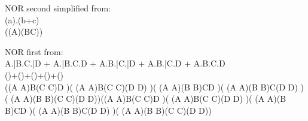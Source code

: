 NOR
 second simplified from: $$$$(a).(b+c)$$
$$$$
$$$$
$$((A)\downarrow (B\downarrow C))$$$$


NOR
 first from: $$$$A.\bar B.C.\bar D + A.\bar B.C.D + A.B.\bar C.\bar D + A.B.\bar C.D + A.B.C.D$$
$$()+()+()+()+()$$
$$$$
$$((A \downarrow  A)\downarrow B\downarrow (C \downarrow  C)\downarrow D )\downarrow ( (A \downarrow  A)\downarrow B\downarrow (C \downarrow  C)\downarrow (D \downarrow  D) )\downarrow ( (A \downarrow  A)\downarrow (B \downarrow  B)\downarrow C\downarrow D )\downarrow ( (A \downarrow  A)\downarrow (B \downarrow  B)\downarrow C\downarrow (D \downarrow  D) )\downarrow ( (A \downarrow  A)\downarrow (B \downarrow  B)\downarrow (C \downarrow  C)\downarrow (D \downarrow  D))\downarrow ((A \downarrow  A)\downarrow B\downarrow (C \downarrow  C)\downarrow D )\downarrow ( (A \downarrow  A)\downarrow B\downarrow (C \downarrow  C)\downarrow (D \downarrow  D) )\downarrow ( (A \downarrow  A)\downarrow (B \downarrow  B)\downarrow C\downarrow D )\downarrow ( (A \downarrow  A)\downarrow (B \downarrow  B)\downarrow C\downarrow (D \downarrow  D) )\downarrow ( (A \downarrow  A)\downarrow (B \downarrow  B)\downarrow (C \downarrow  C)\downarrow (D \downarrow  D))$$$$


